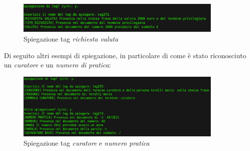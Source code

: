 \begin{figure}[H]
	\centering
	\includegraphics[width=0.9\textwidth]{img/interfaces/CLI-spiegazioneRich.png}
	\caption[Schermata CLI spiegazione]{Spiegazione tag \emph{richiesta valuta}}
	\label{CLI-spiegaRichiesta}
\end{figure}

Di seguito altri esempi di spiegazione, in particolare di come è stato riconosciuto un \emph{curatore} e un \emph{numero di pratica}:
\begin{figure}[H]
	\centering
	\includegraphics[width=0.9\textwidth]{img/interfaces/CLI-spiegazione.png}
	\caption[Schermata CLI altre spiegazioni]{Spiegazione tag \emph{curatore} e \emph{numero pratica}}
	\label{CLI-spiega}
\end{figure}
